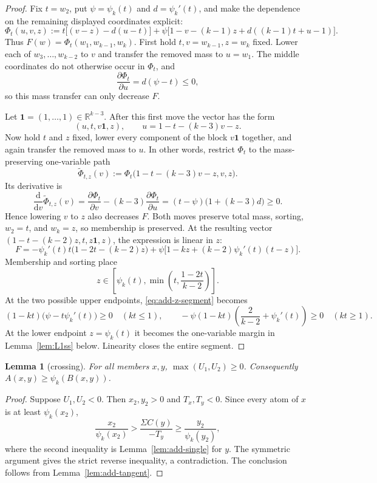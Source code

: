 \documentclass[11pt]{article}
\newtheorem{lemma}[theorem]{Lemma}
\theoremstyle{definition}
\theoremstyle{remark}
\newcommand{\R}{\mathbb{R}}
\newcommand{\one}{\mathbf{1}}
\begin{document}
\begin{proof}
Fix $t=w_2$, put $\psi=\psi_k(t)$ and $d=\psi_k'(t)$, and make the
dependence on the remaining displayed coordinates explicit:
\[
 \Phi_t(u,v,z):=
 t\bigl[(v-z)-d(u-t)\bigr]
 +\psi\bigl[1-v-(k-1)z+d((k-1)t+u-1)\bigr].
\]
Thus $F(w)=\Phi_t(w_1,w_{k-1},w_k)$.  First hold
$t,v=w_{k-1},z=w_k$ fixed.  Lower each of
$w_3,\ldots,w_{k-2}$ to $v$ and transfer the removed mass to
$u=w_1$.  The middle coordinates do not otherwise occur in $\Phi_t$, and
\[
 \frac{\partial\Phi_t}{\partial u}=d(\psi-t)\le0,
\]
so this mass transfer can only decrease $F$.

Let $\one=(1,\ldots,1)\in\R^{k-3}$.  After this first move the vector has
the form
\[
 (u,t,v\one,z),
 \qquad u=1-t-(k-3)v-z.
\]
Now hold $t$ and $z$ fixed, lower every component of the block $v\one$
together, and again transfer the removed mass to $u$.  In other words,
restrict $\Phi_t$ to the mass-preserving one-variable path
\[
 \widetilde\Phi_{t,z}(v)
 :=\Phi_t\bigl(1-t-(k-3)v-z,v,z\bigr).
\]
Its derivative is
\[
 \frac{\mathrm d}{\mathrm dv}\widetilde\Phi_{t,z}(v)
 =\frac{\partial\Phi_t}{\partial v}
  -(k-3)\frac{\partial\Phi_t}{\partial u}
 =(t-\psi)\bigl(1+(k-3)d\bigr)\ge0.
\]
Hence lowering $v$ to $z$ also decreases $F$.  Both moves preserve total
mass, sorting, $w_2=t$, and $w_k=z$, so membership is preserved.  At the
resulting vector $(1-t-(k-2)z,t,z\one,z)$, the expression is linear in
$z$:
\begin{equation}\label{eq:add-z-segment}
 F=-\psi_k'(t)t\bigl(1-2t-(k-2)z\bigr)
 +\psi\bigl[1-kz+(k-2)\psi_k'(t)(t-z)\bigr].
\end{equation}
Membership and sorting place
\[
 z\in\left[\psi_k(t),\min\left(t,\frac{1-2t}{k-2}\right)\right].
\]
At the two possible upper endpoints, \eqref{eq:add-z-segment} becomes
\[
 (1-kt)\bigl(\psi-t\psi_k'(t)\bigr)\ge0\quad(kt\le1),
 \qquad
 -\psi(1-kt)\left(\frac2{k-2}+\psi_k'(t)\right)\ge0
 \quad(kt\ge1).
\]
At the lower endpoint $z=\psi_k(t)$ it becomes the one-variable margin in
Lemma~\ref{lem:L1ss} below.  Linearity closes the entire segment.
\end{proof}

\begin{lemma}[crossing]\label{lem:add-crossing}
For all members $x,y$, $\max(U_1,U_2)\ge0$.  Consequently
$A(x,y)\ge\psi_k(B(x,y))$.
\end{lemma}

\begin{proof}
Suppose $U_1,U_2<0$.  Then $x_2,y_2>0$ and $T_x,T_y<0$.  Since every
atom of $x$ is at least $\psi_k(x_2)$,
\[
 \frac{x_2}{\psi_k(x_2)}>
 \frac{\Sigma C(y)}{-T_y}\ge
 \frac{y_2}{\psi_k(y_2)},
\]
where the second inequality is Lemma~\ref{lem:add-single} for $y$.  The
symmetric argument gives the strict reverse inequality, a contradiction.
The conclusion follows from Lemma~\ref{lem:add-tangent}.
\end{proof}
\end{document}
